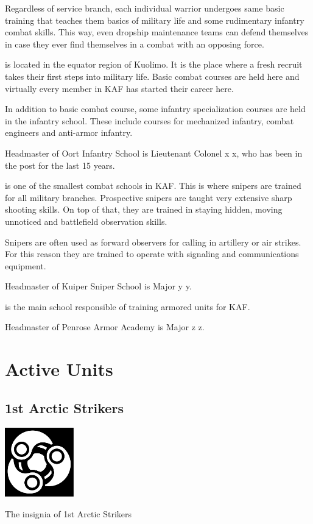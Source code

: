 \documentclass{tufte-book}
\begin{document}
Regardless of service branch, each individual warrior undergoes same basic
training that teaches them basics of military life and some rudimentary
infantry combat skills. This way, even dropship maintenance teams can defend
themselves in case they ever find themselves in a combat with an opposing
force.

 is located in the equator region of Kuolimo.
It is the place where a fresh recruit takes their first steps into military
life. Basic combat courses are held here and virtually every member in KAF
has started their career here.

In addition to basic combat course, some infantry specialization courses are
held in the infantry school. These include courses for mechanized infantry,
combat engineers and anti-armor infantry.

Headmaster of Oort Infantry School is Lieutenant Colonel x x,
who has been in the post for the last 15 years.

 is one of the smallest combat schools in KAF.
This is where snipers are trained for all military branches. Prospective
snipers are taught very extensive sharp shooting skills. On top of that, they
are trained in staying hidden, moving unnoticed and battlefield observation
skills.

Snipers are often used as forward observers for calling in artillery or air
strikes. For this reason they are trained to operate with signaling and
communications equipment.

Headmaster of Kuiper Sniper School is Major y y.

 is the main school responsible of training
armored units for KAF.

Headmaster of Penrose Armor Academy is Major z z.

\section{Active Units}
\label{sc:active_units}

\subsection{1st Arctic Strikers}
\label{sc:arctic_strikers}

\begin{marginfigure}[0\baselineskip]
  \includegraphics[width=3cm]{triple-yin}
  \caption{The insignia of 1st Arctic Strikers}
  \label{fig:arctic_strikers}
\end{marginfigure}
\end{document}
